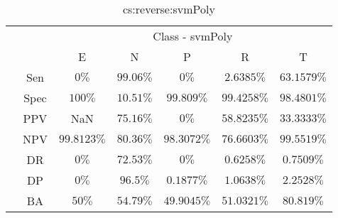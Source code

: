 \begin{table}[!ht]
	\centering
	\begin{tabular}{|c|c|c|c|c|c|c|}
		\cline{3-7}
		\multicolumn{2}{c|}{} & \multicolumn{5}{c|}{Class - svmPoly} \\ \cline{3-7}
		\multicolumn{2}{c|}{} & E & N & P & R & T \\ \hline
		\multirow{7}{*}{\rotatebox{90}{Statistics}} & Sen & $0\%$ & $99.06\%$ & $0\%$ & $2.6385\%$ & $63.1579\%$ \\ \cline{2-7}
		 & Spec & $100\%$ & $10.51\%$ & $99.809\%$ & $99.4258\%$ & $98.4801\%$ \\ \cline{2-7}
		 & PPV & NaN & $75.16\%$ & $0\%$ & $58.8235\%$ & $33.3333\%$ \\ \cline{2-7}
		 & NPV & $99.8123\%$ & $80.36\%$ & $98.3072\%$ & $76.6603\%$ & $99.5519\%$ \\ \cline{2-7}
		 & DR & $0\%$ & $72.53\%$ & $0\%$ & $0.6258\%$ & $0.7509\%$ \\ \cline{2-7}
		 & DP & $0\%$ & $96.5\%$ & $0.1877\%$ & $1.0638\%$ & $2.2528\%$ \\ \cline{2-7}
		 & BA & $50\%$ & $54.79\%$ & $49.9045\%$ & $51.0321\%$ & $80.819\%$ \\ \hline
	\end{tabular}
	\caption{cs:reverse:svmPoly}
	\label{tab:cs:reverse:svmPoly}
\end{table}
